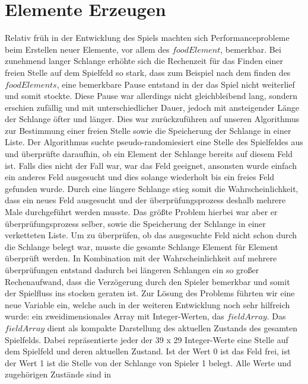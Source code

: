 \section{Elemente Erzeugen}
\label{Elemente Erzeugen}
Relativ fr{\"u}h in der Entwicklung des Spiels machten sich Performanceprobleme beim Erstellen neuer Elemente, vor allem des $foodElement$, bemerkbar. Bei zunehmend langer Schlange erh{\"o}hte sich die Rechenzeit f{\"u}r das Finden einer freien Stelle auf dem Spielfeld so stark, dass zum Beispiel nach dem finden des $foodElements$, eine bemerkbare Pause entstand in der das Spiel nicht weiterlief und somit stockte. Diese Pause war allerdings nicht gleichbleibend lang, sondern erschien zuf{\"a}llig und mit unterschiedlicher Dauer, jedoch mit ansteigender L{\"a}nge der Schlange {\"o}fter und l{\"a}nger.
Dies war zur{\"u}ckzuf{\"u}hren auf unseren Algorithmus zur Bestimmung einer freien Stelle sowie die Speicherung der Schlange in einer Liste. Der Algorithmus suchte pseudo-randomiesiert eine Stelle des Spielfeldes aus und {\"u}berpr{\"u}fte daraufhin, ob ein Element der Schlange bereits auf diesem Feld ist. Falls dies nicht der Fall war, war das Feld geeignet, ansonsten wurde einfach ein anderes Feld ausgesucht und dies solange wiederholt bis ein freies Feld gefunden wurde. Durch eine l{\"a}ngere Schlange stieg somit die Wahrscheinlichkeit, dass ein neues Feld ausgesucht und der {\"u}berpr{\"u}fungsprozess deshalb mehrere Male durchgef{\"u}hrt werden musste. Das gr{\"o}ßte Problem hierbei war aber er {\"u}berpr{\"u}fungsprozess selber, sowie die Speicherung der Schlange in einer verketteten Liste. Um zu {\"u}berpr{\"u}fen, ob das ausgesuchte Feld nicht schon durch die Schlange belegt war, musste die gesamte Schlange Element f{\"u}r Element {\"u}berpr{\"u}ft werden. In Kombination mit der Wahrscheinlichkeit auf mehrere {\"u}berpr{\"u}fungen entstand dadurch bei l{\"a}ngeren Schlangen ein so großer Rechenaufwand, dass die  Verz{\"o}gerung durch den Spieler bemerkbar und somit der Spielfluss ins stocken geraten ist.
Zur L{\"o}sung des Problems f{\"u}hrten wir eine neue Variable ein, welche auch in der weiteren Entwicklung noch sehr hilfreich wurde: ein zweidimensionales Array mit Integer-Werten, das $fieldArray$. Das $fieldArray$ dient als kompakte Darstellung des aktuellen Zustands des gesamten Spielfelds. Dabei repr{\"a}sentierte jeder der 39 x 29 Integer-Werte eine Stelle auf dem Spielfeld und deren aktuellen Zustand. Ist der Wert 0 ist das Feld frei, ist der Wert 1 ist die Stelle von der Schlange von Spieler 1 belegt. Alle Werte und zugeh{\"o}rigen Zust{\"a}nde sind in 
